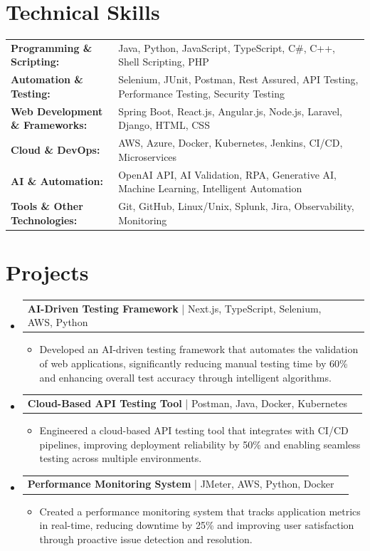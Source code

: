 \documentclass[letterpaper,10pt]{article}
\makeatletter
\newcommand{\resumeItem}[1]{
  \item{\fontsize{8pt}{9pt}\selectfont
    #1 \vspace{-3pt}
  }
}
\newcommand{\resumeProjectHeading}[2]{
    \item
    \begin{tabular*}{1.001\textwidth}{l@{\extracolsep{\fill}}r}
      \fontsize{8.5pt}{10pt}#1 & \textbf{\fontsize{8.5pt}{10pt} #2}\\
    \end{tabular*}\vspace{-7pt}
}
\newcommand{\resumeSubHeadingListStart}{\begin{itemize}[leftmargin=0pt, label={}]}
\newcommand{\resumeSubHeadingListEnd}{\end{itemize}}
\newcommand{\resumeItemListStart}{\begin{itemize}[leftmargin=*]}
\newcommand{\resumeItemListEnd}{\end{itemize}\vspace{-5pt}}
\makeatother
\begin{document}
\section{Technical Skills}
        \vspace{-14pt}
        \begin{table}[h]
            \fontsize{8pt}{9pt}\selectfont
            \begin{tabular}{p{0.3\linewidth} p{0.7\linewidth}}
                \textbf{Programming \& Scripting:} & Java, Python, JavaScript, TypeScript, C\#, C++, Shell Scripting, PHP \\
                \textbf{Automation \& Testing:} & Selenium, JUnit, Postman, Rest Assured, API Testing, Performance Testing, Security Testing \\
                \textbf{Web Development \& Frameworks:} & Spring Boot, React.js, Angular.js, Node.js, Laravel, Django, HTML, CSS \\
                \textbf{Cloud \& DevOps:} & AWS, Azure, Docker, Kubernetes, Jenkins, CI/CD, Microservices \\
                \textbf{AI \& Automation:} & OpenAI API, AI Validation, RPA, Generative AI, Machine Learning, Intelligent Automation \\
                \textbf{Tools \& Other Technologies:} & Git, GitHub, Linux/Unix, Splunk, Jira, Observability, Monitoring \\
            \end{tabular}
        \end{table}
 \vspace{-18pt}

\section{Projects}
    \vspace{-5pt}
    \resumeSubHeadingListStart
          \resumeProjectHeading
            {\textbf{AI-Driven Testing Framework} | Next.js, TypeScript, Selenium, AWS, Python}{}
            \resumeItemListStart
                \resumeItem{Developed an AI-driven testing framework that automates the validation of web applications, significantly reducing manual testing time by 60\% and enhancing overall test accuracy through intelligent algorithms.}
            \resumeItemListEnd
        \vspace{-12pt}
    
        \resumeProjectHeading
            {\textbf{Cloud-Based API Testing Tool} | Postman, Java, Docker, Kubernetes}{}
        \resumeItemListStart
                \resumeItem{Engineered a cloud-based API testing tool that integrates with CI/CD pipelines, improving deployment reliability by 50\% and enabling seamless testing across multiple environments.}
        \resumeItemListEnd
      \vspace{-12pt}
      \resumeProjectHeading
        {\textbf{Performance Monitoring System} | JMeter, AWS, Python, Docker}{}
    \resumeItemListStart
            \resumeItem{Created a performance monitoring system that tracks application metrics in real-time, reducing downtime by 25\% and improving user satisfaction through proactive issue detection and resolution.}
    \resumeItemListEnd
    \resumeSubHeadingListEnd
\end{document}
